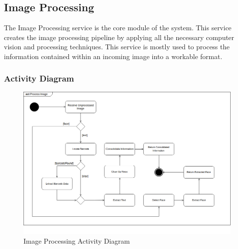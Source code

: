 \documentclass{article}
\begin{document}
\subsection{Image Processing}
The Image Processing service is the core module of the system. This service creates the image processing pipeline by applying all the necessary computer vision and processing techniques. This service is mostly used to process the information contained within an incoming image into a workable format. 
\subsubsection{Activity Diagram}
	\begin{figure}[H]
	    \centering
	    \includegraphics[scale=0.5]{img/process_activity.png}
	    \caption{Image Processing Activity Diagram}
	 \end{figure}
	 \pagebreak
\end{document}
